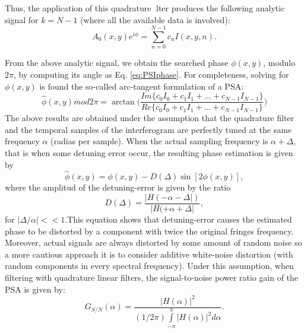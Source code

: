 Thus, the application of this quadrature lter produces the following analytic
signal for $k = N-1$ (where all the available data is involved):
\begin{equation}
 A_0(x,y)e^{i\phi}=\sum^{N-1}_{n=0} c_n I(x,y,n).
\end{equation}

From the above analytic signal, we obtain the searched phase $\phi(x,y)$, modulo
$2\pi$, by computing its angle as Eq. \eqref{eq:PSIphase}. For completeness, 
solving for $\phi(x,y)$ is found the so-called arc-tangent formulation of a PSA:
\begin{equation}
 \hat{\phi}(x,y) mod 2\pi= \arctan \Bigg(\frac{Im\{c_0I_0+c_1I_1 + \dots + c_{N-1}
I_{N-1}\}}{Re\{c_0I_0+c_1I_1 + \dots + c_{N-1} I_{N-1}\}}  \Bigg)
\end{equation}
The above results are obtained under the assumption that the quadrature filter
and the temporal samples of the interferogram are perfectly tuned at the same
frequency $\alpha$ (radias per sample). When the actual sampling frequency is
$\alpha+\Delta$, that is when some detuning error occur, the resulting phase 
estimation is given by
\begin{equation}
 \hat{\phi}(x,y)=\phi(x,y)-D(\Delta)\sin[2\phi(x,y)],
\end{equation}
where the amplitud of the detuning-error is given by the ratio
\begin{equation}
 D(\Delta)=\frac{|H(-\alpha-\Delta|)}{|H(+\alpha+\Delta|},
\end{equation}
for $|\Delta/\alpha|<<1$.This equation shows that detuning-error causes the 
estimated phase to be distorted by a component with twice the original fringes 
frequency. Moreover, actual signals are always distorted by some amount of random
noise so a more cautious approach it is to consider additive white-noise 
distortion (with random components in every spectral frequency). Under this 
assumption, when filtering with quadrature linear filters, the signal-to-noise 
power ratio gain of the PSA is given by:
\begin{equation}
 G_{S/N}(\alpha)=\frac{|H(\alpha)|^2}{(1/2\pi)\int\limits_{-\pi}^{\pi}
|H(\alpha)|^2 d\alpha}.
\end{equation}













